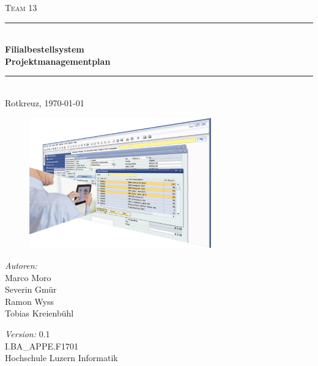 \begin{titlepage}   

\begin{center}
\textsc{\Large Team 13}\\[0.5cm]

\newcommand{\HRule}{\rule{\linewidth}{0.5mm}}
\HRule \\[0.4cm]
{ \huge \bfseries Filialbestellsystem}\\[0.4cm]
{ \LARGE \bfseries Projektmanagementplan}\\[0.4cm]
\HRule \\[1.5cm]

{\large Rotkreuz, \today}

\begin{figure}[H]%
\centering
\includegraphics[width=0.7\textwidth]{Images/Titelbild.png}
\label{fig:title}
\end{figure}
\begin{minipage}{0.4\textwidth}
\begin{flushleft} \large
\emph{Autoren:}\\
Marco Moro\\
Severin Gmür\\
Ramon Wyss\\
Tobias Kreienbühl\\
\end{flushleft}
\end{minipage}
\hfill
\begin{minipage}{0.4\textwidth}
\begin{flushright} \large
\end{flushright}
\end{minipage}
\large
\vfill
\emph{Version:} 0.1\\
I.BA\_APPE.F1701 \\
Hochschule Luzern Informatik

\end{center}

\end{titlepage}
